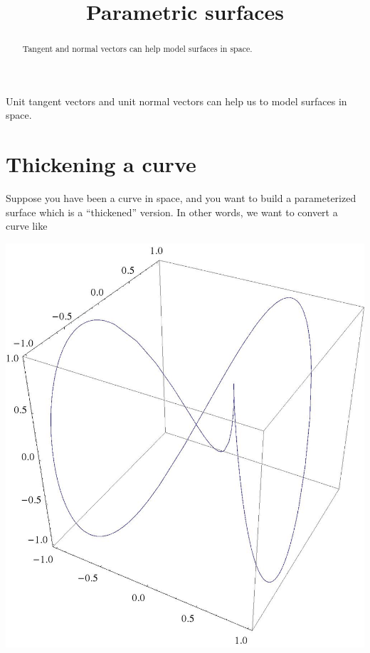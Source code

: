 \documentclass{ximera}
\title[Dig-In:]{Parametric surfaces}
\begin{document}
\begin{abstract}
  Tangent and normal vectors can help model surfaces in space.
\end{abstract}
\maketitle

Unit tangent vectors and unit normal vectors can help us to model
surfaces in space.

\section{Thickening a curve}

Suppose you have been a curve in space, and you want to build a
parameterized surface which is a ``thickened'' version.  In other
words, we want to convert a curve like
\begin{image}
  \includegraphics{curve.jpg}
\end{image}
\end{document}
